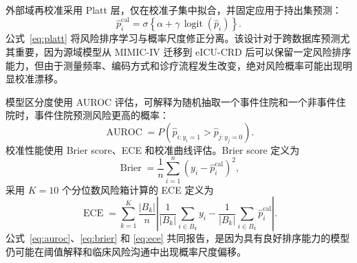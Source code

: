 \documentclass[11pt]{ctexart}
\begin{document}
外部域再校准采用 Platt 层，仅在校准子集中拟合，并固定应用于持出集预测：
\begin{equation}
\hat{p}^{\mathrm{cal}}_i=
\sigma\left\{\alpha+\gamma\,\operatorname{logit}(\hat{p}_i)\right\}.
\label{eq:platt}
\end{equation}
公式~\ref{eq:platt} 将风险排序学习与概率尺度修正分离。该设计对于跨数据库预测尤其重要，因为源域模型从 MIMIC-IV 迁移到 eICU-CRD 后可以保留一定风险排序能力，但由于测量频率、编码方式和诊疗流程发生改变，绝对风险概率可能出现明显校准漂移。

模型区分度使用 AUROC 评估，可解释为随机抽取一个事件住院和一个非事件住院时，事件住院预测风险更高的概率：
\begin{equation}
\operatorname{AUROC}=P(\hat{p}_{i:y_i=1}>\hat{p}_{j:y_j=0}).
\label{eq:auroc}
\end{equation}
校准性能使用 Brier score、ECE 和校准曲线评估。Brier score 定义为
\begin{equation}
\operatorname{Brier}=\frac{1}{n}\sum_{i=1}^{n}(y_i-\hat{p}^{\mathrm{cal}}_i)^2,
\label{eq:brier}
\end{equation}
采用 $K=10$ 个分位数风险箱计算的 ECE 定义为
\begin{equation}
\operatorname{ECE}=\sum_{k=1}^{K}\frac{|B_k|}{n}\left|
\frac{1}{|B_k|}\sum_{i\in B_k}y_i-
\frac{1}{|B_k|}\sum_{i\in B_k}\hat{p}^{\mathrm{cal}}_i
\right|.
\label{eq:ece}
\end{equation}
公式~\ref{eq:auroc}、\ref{eq:brier} 和 \ref{eq:ece} 共同报告，是因为具有良好排序能力的模型仍可能在阈值解释和临床风险沟通中出现概率尺度偏移。
\end{document}
